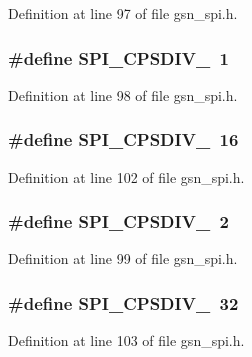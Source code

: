 Definition at line 97 of file gsn\_\-spi.h.

\hypertarget{a00587_a4ac75189ac4f7b124d9b86a73a1cdcd5}{
\subsubsection[{SPI\_\-CPSDIV\_\-1}]{\setlength{\rightskip}{0pt plus 5cm}\#define SPI\_\-CPSDIV\_~1}}
\label{a00587_a4ac75189ac4f7b124d9b86a73a1cdcd5}


Definition at line 98 of file gsn\_\-spi.h.

\hypertarget{a00587_a3874bbb3a35586cbda40389de9451dfe}{
\subsubsection[{SPI\_\-CPSDIV\_\-16}]{\setlength{\rightskip}{0pt plus 5cm}\#define SPI\_\-CPSDIV\_~16}}
\label{a00587_a3874bbb3a35586cbda40389de9451dfe}


Definition at line 102 of file gsn\_\-spi.h.

\hypertarget{a00587_ac09f298bf1f117b25b0683eb26d92757}{
\subsubsection[{SPI\_\-CPSDIV\_\-2}]{\setlength{\rightskip}{0pt plus 5cm}\#define SPI\_\-CPSDIV\_~2}}
\label{a00587_ac09f298bf1f117b25b0683eb26d92757}


Definition at line 99 of file gsn\_\-spi.h.

\hypertarget{a00587_a23ad18291368cbe0b4df864168f7a05c}{
\subsubsection[{SPI\_\-CPSDIV\_\-32}]{\setlength{\rightskip}{0pt plus 5cm}\#define SPI\_\-CPSDIV\_~32}}
\label{a00587_a23ad18291368cbe0b4df864168f7a05c}


Definition at line 103 of file gsn\_\-spi.h.

